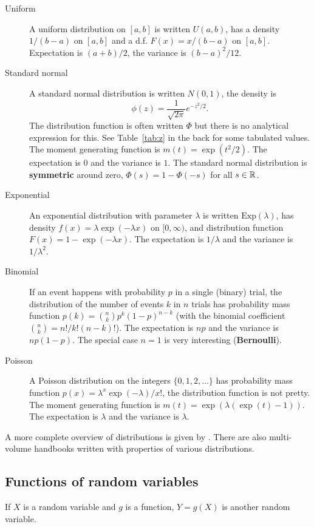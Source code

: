 \documentclass[10pt]{article}
\begin{document}
\begin{description}
\item[Uniform] A uniform distribution on $[a,b]$ is written $U(a,b)$, has a density $1/(b-a)$ on $[a,b]$ and 
a d.f. $F(x)=x/(b-a)$ on $[a,b]$. Expectation is $(a+b)/2$, the variance is $(b-a)^2/12$. 
\item[Standard normal] A standard normal distribution is written $N(0,1)$,  the density is 
\[ \phi(z) = \frac{1}{\sqrt{2\pi}} e^{-z^2/2}.\] The distribution function is often written $\Phi$ but
there is no analytical expression for this. See Table~\ref{tab:z} in the back for some tabulated values.
The moment generating function is $m(t) = \exp(t^2/2)$. The expectation is $0$ and the variance is $1$. The 
standard normal distribution is \textbf{symmetric} around zero, $\Phi(s)=1-\Phi(-s)$ for all $s\in\mathbb{R}$.
\item[Exponential] An exponential distribution with parameter $\lambda$ is written $\mathrm{Exp}(\lambda)$, 
has density $f(x)=\lambda \exp(-\lambda  x)$ on $[0,\infty)$, and distribution function $F(x)=1- \exp(-\lambda x)$.
The expectation is $1/\lambda$ and the variance is $1/\lambda^2$.
\item[Binomial] If an event happens with probability $p$ in a single (binary)
trial, the distribution of the number of events $k$ in $n$ trials has
probability mass function $p(k) = \binom{n}{k} p^k (1-p)^{n-k}$ (with the
binomial coefficient $\binom{n}{k} = n!/k!(n-k)!$). The expectation is $n p$ and the variance is $n p(1-p)$. The special case $n=1$ is
very interesting (\textbf{Bernoulli}).
\item[Poisson] A Poisson distribution on the integers $\{0,1,2,\dots\}$ has probability mass function 
$p(x) = \lambda^x \exp(-\lambda)/x!$, the distribution function is not pretty. The moment generating function
is $m(t) = \exp(\lambda( \exp(t) -1))$. The expectation is $\lambda$ and the variance is $\lambda$.
\end{description}

A more complete overview of distributions is given by \citet{Leemis2008}. There are also multi-volume
handbooks written with properties of various distributions. 

\subsection{Functions of random variables}
If $X$ is a random variable and $g$ is a function, $Y=g(X)$ is another random variable.
\end{document}
